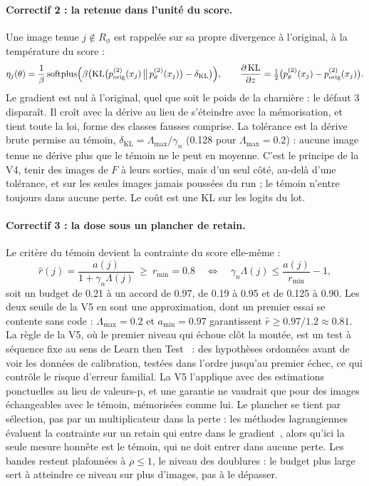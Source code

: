 \documentclass[11pt,a4paper]{article}
\newcommand{\KL}{\operatorname{KL}}
\newcommand{\orig}{\mathrm{orig}}
\begin{document}
\paragraph{Correctif 2 : la retenue dans l'unité du score.} Une image tenue $j\notin R_\phi$ est
rappelée sur sa propre divergence à l'original, à la température du score :
\begin{equation}\label{eq:v51hold}
  \eta_j(\theta)=\frac1\beta\operatorname{softplus}\Bigl(\beta\bigl(\KL\bigl(p^{(2)}_\orig(x_j)\,\big\|\,
  p^{(2)}_\theta(x_j)\bigr)-\delta_{\KL}\bigr)\Bigr),\qquad
  \frac{\partial\KL}{\partial z}=\tfrac12\bigl(p^{(2)}_\theta(x_j)-p^{(2)}_\orig(x_j)\bigr).
\end{equation}
Le gradient est nul à l'original, quel que soit le poids de la charnière : le défaut 3 disparaît. Il
croît avec la dérive au lieu de s'éteindre avec la mémorisation, et tient toute la loi, forme des
classes fausses comprise. La tolérance est la dérive brute permise au témoin,
$\delta_{\KL}=\Lambda_{\max}/\gamma_n$ (\num{0.128} pour $\Lambda_{\max}=\num{0.2}$) : aucune image
tenue ne dérive plus que le témoin ne le peut en moyenne. C'est le principe de la V4, tenir des
images de $F$ à leurs sorties, mais d'un seul côté, au-delà d'une tolérance, et sur les seules
images jamais poussées du run ; le témoin n'entre toujours dans aucune perte. Le coût est une KL sur
les logits du lot.

\paragraph{Correctif 3 : la dose sous un plancher de retain.} Le critère du témoin devient la
contrainte du score elle-même :
\begin{equation}\label{eq:v51retain}
  \hat r(j)=\frac{a(j)}{1+\gamma_n\Lambda(j)}\ \ge\ r_{\min}=\num{0.8}
  \quad\Longleftrightarrow\quad \gamma_n\Lambda(j)\le\frac{a(j)}{r_{\min}}-1,
\end{equation}
soit un budget de \num{0.21} à un accord de \num{0.97}, de \num{0.19} à \num{0.95} et de \num{0.125}
à \num{0.90}. Les deux seuils de la V5 en sont une approximation, dont un premier essai se contente
sans code : $\Lambda_{\max}=\num{0.2}$ et $a_{\min}=\num{0.97}$ garantissent
$\hat r\ge\num{0.97}/\num{1.2}\approx\num{0.81}$. La règle de la V5, où le premier niveau qui échoue
clôt la montée, est un test à séquence fixe au sens de Learn then Test~\cite{angelopoulos2025ltt} :
des hypothèses ordonnées avant de voir les données de calibration, testées dans l'ordre jusqu'au
premier échec, ce qui contrôle le risque d'erreur familial. La V5 l'applique avec des estimations
ponctuelles au lieu de valeurs-p, et une garantie ne vaudrait que pour des images échangeables avec
le témoin, mémorisées comme lui. Le plancher se tient par sélection, pas par un multiplicateur dans
la perte : les méthodes lagrangiennes évaluent la contrainte sur un retain qui entre dans le
gradient~\cite{entesari2025constrained}, alors qu'ici la seule mesure honnête est le témoin, qui ne
doit entrer dans aucune perte. Les bandes restent plafonnées à $\rho\le1$, le niveau des doublures :
le budget plus large sert à atteindre ce niveau sur plus d'images, pas à le dépasser.
\end{document}
